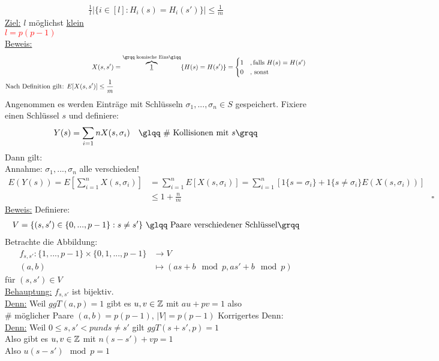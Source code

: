 \begin{align*}
    \frac{1}{l} \left| \{i \in [l]: H_i(s) = H_i(s')\}\right| \leq \frac{1}{m}
\end{align*}
\underline{Ziel:} $l$ möglichst \underline{klein}\\
\textcolor{red}{$l = p(p-1)$}\\
\underline{Beweis:}
\begin{align*}
    X(s, s') &= \overbrace{\underline{1}}^{\text{\grqq komische Eins\glqq}} \{ H(s) = H(s')\} = \begin{cases}
    1 & , \text{falls } H(s) = H(s')\\
    0 & \text{, sonst}
    \end{cases}\\
    \text{Nach Definition gilt: } E[X(s, s')] \leq \frac{1}{m}\\
\end{align*}
Angenommen es werden Einträge mit Schlüsseln $\sigma_1, ..., \sigma_n \in S$ gespeichert. Fixiere einen Schlüssel $s$ und definiere:
\begin{align*}
    Y(s) &= \sum_{i = 1}{n} X(s, \sigma_i) & \text{\glqq \# Kollisionen mit $s$\grqq} 
\end{align*}
Dann gilt:\\
Annahme: $\sigma_1, ..., \sigma_n$ alle verschieden!
\begin{align*}
    E(Y(s)) = E\left[\sum_{i = 1}^{n} X(s, \sigma_i) \right] &= \sum_{i = 1}^{n} E \left[X(s, \sigma_i)\right] = \sum_{i = 1}^{n} \left[1 \{s = \sigma_i\} + 1 \{s \neq \sigma_i\} E(X(s, \sigma_i))\right]\\
    &\leq 1 + \frac{n}{m} & \square
\end{align*}
\underline{Beweis:}
Definiere:
\begin{align*}
    V = \{ (s, s') \in \{0, ..., p-1\}: s \neq s'\} \text{ \glqq Paare verschiedener Schlüssel\grqq}
\end{align*}
Betrachte die Abbildung:
\begin{align*}
    f_{s, s'}: \{1, ..., p-1\} \times \{0, 1, ..., p-1\} &\rightarrow V\\
    (a, b) &\mapsto (as + b \mod p, as' + b \mod p)
\end{align*}
für $(s, s') \in V$\\
\underline{Behauptung:} $f_{s, s'}$ ist bijektiv.\\
\underline{Denn:} Weil $ggT(a, p) = 1$ gibt es $u, v \in \mathbb Z$ mit $au + pv = 1$ also  \\
$\#$ möglicher Paare $(a, b) = p(p-1)$, $|V| = p(p-1)$
Korrigertes Denn:\\
\underline{Denn:} Weil $0 \leq s, s' < p und s \neq s'$ gilt $ggT(s + s', p) = 1$\\
Also gibt es $u, v \in \mathbb Z$ mit $n(s - s') + vp = 1$\\
Also $u(s- s') \mod p = 1$

